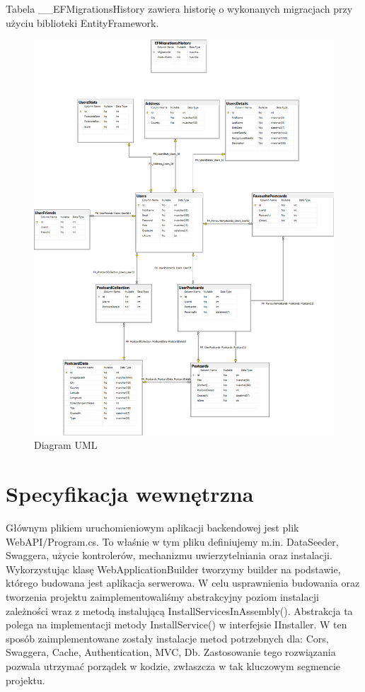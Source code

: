\documentclass[a4paper,twoside,12pt]{book}
\begin{document}
Tabela \_\_EFMigrationsHistory zawiera historię o wykonanych migracjach przy użyciu biblioteki EntityFramework. 

\newpage
\begin{figure}[H]
    \centering
    \includegraphics[width=1\textwidth]{diagram1.png}
    \caption{Diagram UML}
    \label{Kompilator}
\end{figure}
\newpage

\section{Specyfikacja wewnętrzna}
Głównym plikiem uruchomieniowym aplikacji backendowej jest plik WebAPI/Program.cs. To właśnie w tym pliku definiujemy m.in. DataSeeder, Swaggera, użycie kontrolerów, mechanizmu uwierzytelniania oraz instalacji. Wykorzystując klasę WebApplicationBuilder tworzymy builder na podstawie, którego budowana jest aplikacja serwerowa. W celu usprawnienia budowania oraz tworzenia projektu zaimplementowaliśmy abstrakcyjny poziom instalacji zależności wraz z metodą instalującą InstallServicesInAssembly(). Abstrakcja ta polega na implementacji metody InstallService() w interfejsie IInstaller. W ten sposób zaimplementowane zostały instalacje metod potrzebnych dla: Cors, Swaggera, Cache, Authentication, MVC, Db. Zastosowanie tego rozwiązania pozwala utrzymać porządek w kodzie, zwłaszcza w tak kluczowym segmencie projektu. 
\end{document}
